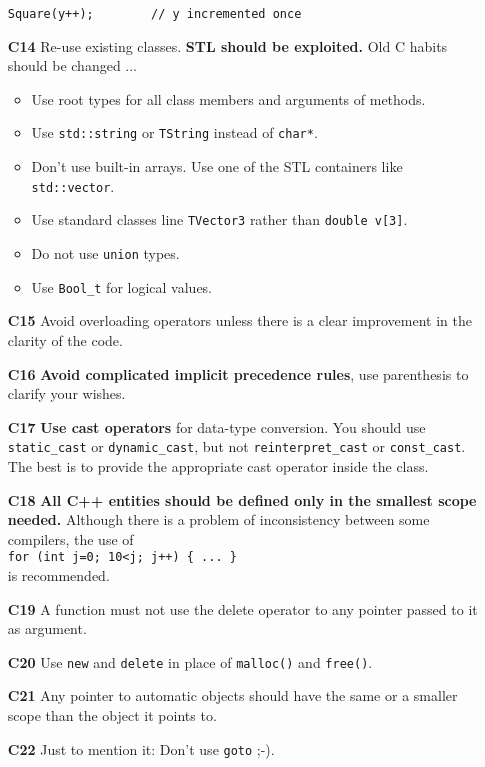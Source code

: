 \documentclass[a4paper,10pt]{article}
\begin{document}
\begin{itemize}
\begin{verbatim}
Square(y++);        // y incremented once
  \end{verbatim}
\item[\bf C14] Re-use existing classes. {\bf STL should be exploited.} Old
  C habits should be changed ...
  \begin{itemize}
    \item Use root types for all class members and arguments of methods.
    \item Use {\tt std::string} or {\tt TString} instead of {\tt char*}.
    \item Don't use built-in arrays. Use one of the STL containers like
          {\tt std::vector}.
    \item Use standard classes line {\tt TVector3} rather than {\tt double v[3]}.
    \item Do not use {\tt union} types.
    \item Use {\tt Bool\_t} for logical values.
  \end{itemize}
\item[\bf C15] Avoid overloading operators unless there is a clear improvement
  in the clarity of the code.
\item[\bf C16] {\bf Avoid complicated implicit precedence rules}, use parenthesis
  to clarify your wishes.
\item[\bf C17] {\bf Use cast operators} for data-type conversion. You should use
  {\tt static\_cast} or {\tt dynamic\_cast}, but not {\tt reinterpret\_cast} or
  {\tt const\_cast}. The best is to provide the appropriate cast operator inside
  the class.
\item[\bf C18] {\bf All C++ entities should be defined only in the smallest
    scope needed.} Although there is a problem of inconsistency between some
  compilers, the use of\\
  {\tt for (int j=0; 10<j; j++) \{ ... \}}\\
  is recommended.
\item[\bf C19] A function must not use the delete operator to any pointer
  passed to it as argument.
\item[\bf C20] Use {\tt new} and {\tt delete} in place of {\tt malloc()} and
  {\tt free()}.
\item[\bf C21] Any pointer to automatic objects should have the same or a
  smaller scope than the object it points to.
\item[\bf C22] Just to mention it: Don't use {\tt goto} ;-).
\end{itemize}
\end{document}
